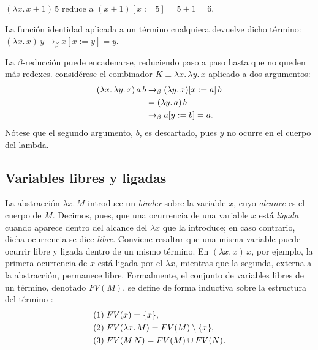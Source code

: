 \begin{example}
  $(\lambda x.\, x + 1)\, 5$ reduce a $(x + 1)[x := 5] = 5 + 1 = 6$.
\end{example}

\begin{example}
  La función identidad aplicada a un término cualquiera devuelve dicho término:
  $(\lambda x.\, x)\, y \to_\beta x[x := y] = y$.
\end{example}

\begin{example}
  La $\beta$-reducción puede encadenarse, reduciendo paso a paso hasta que no queden
  más redexes. considérese el combinador $K \equiv \lambda x.\, \lambda y.\, x$ aplicado a dos argumentos:
  \begin{align}
    (\lambda x.\, \lambda y.\, x)\, a\, b
      & \to_\beta (\lambda y.\, x)[x := a]\, b \notag \\
      & = (\lambda y.\, a)\, b \notag \\
      & \to_\beta a[y := b] = a. \notag
  \end{align}
  N\'otese que el segundo argumento, $b$, es descartado, pues $y$ no ocurre en el cuerpo del lambda.
\end{example}

\subsection{Variables libres y ligadas}
La abstracci\'on $\lambda x.\, M$ introduce un \textit{binder} sobre la variable
$x$, cuyo \textit{alcance} es el cuerpo de $M$. Decimos, pues, que una ocurrencia de
una variable $x$ est\'a \textit{ligada} cuando aparece dentro del alcance del $\lambda x$
que la introduce; en caso contrario, dicha ocurrencia se dice \textit{libre}.
\newline
\newline
Conviene resaltar que una misma variable puede ocurrir libre y ligada dentro de un mismo
t\'ermino. En $(\lambda x.\, x)\, x$, por ejemplo, la primera ocurrencia de $x$ est\'a
ligada por el $\lambda x$, mientras que la segunda, externa a la abstracci\'on, permanece
libre. Formalmente, el conjunto de variables libres de un t\'ermino, denotado $FV(M)$, se define
de forma inductiva sobre la estructura del t\'ermino \citep{pierce2002}:
\begin{align}
& (1) \; FV(x) = \{x\}, \notag \\
& (2) \; FV(\lambda x.\, M) = FV(M) \setminus \{x\}, \notag \\
& (3) \; FV(M\,N) = FV(M) \cup FV(N). \notag
\end{align}


